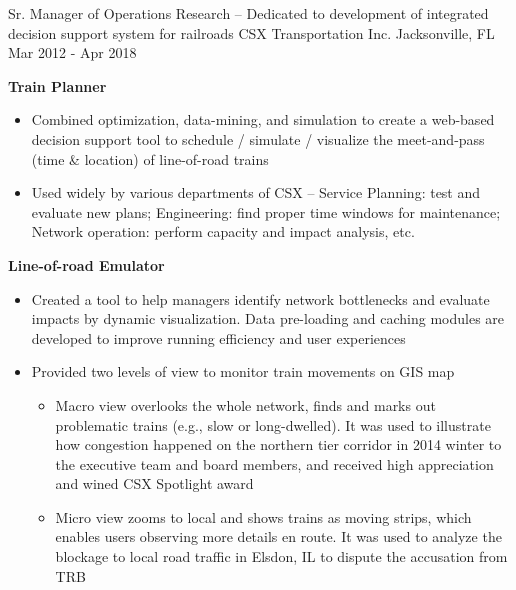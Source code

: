 \begin{cventries}

\cventry
{Sr. Manager of Operations Research \tiny{-- Dedicated to development of integrated decision support system for railroads}}            %
{CSX Transportation Inc. }                %
{Jacksonville, FL}                       %
{Mar 2012 - Apr 2018}                     %
{
    \begin{cvitems}
    \item {
        \textbf{Train Planner} 
        \begin{itemize}
            \item  Combined optimization, data-mining, and simulation to create a web-based decision support tool to schedule / simulate / visualize the meet-and-pass (time \& location) of line-of-road trains 
            \item  Used widely by various departments of CSX -- Service Planning: test and evaluate new plans; Engineering: find proper time windows for maintenance; Network operation: perform capacity and impact analysis, etc.
        \end{itemize}           
    }
    \item {
        \textbf{Line-of-road Emulator} 
        \begin{itemize}
        \item  Created a tool to help managers identify network bottlenecks and evaluate impacts by dynamic visualization. 
               Data pre-loading and caching modules are developed to improve running efficiency and user experiences
        \item  Provided two levels of view to monitor train movements on GIS map  
        \begin{itemize}
            \item  Macro view overlooks the whole network, finds and marks out problematic trains (e.g., slow or long-dwelled). 
                   It was used to illustrate how congestion happened on the northern tier corridor in 2014 winter to the executive team and board members, 
                   and received high appreciation and wined CSX Spotlight award
            \item  Micro view zooms to local and shows trains as moving strips, which enables users observing more details en route. 
                   It was used to analyze the blockage to local road traffic in Elsdon, IL to dispute the accusation from TRB

\end{itemize}
\end{itemize}}
\end{cvitems}}
\end{cventries}
